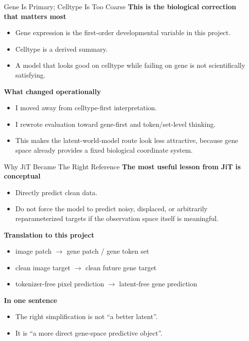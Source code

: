 \documentclass[aspectratio=169,11pt]{beamer}
\begin{document}
\begin{frame}{Gene Is Primary; Celltype Is Too Coarse}
\textbf{This is the biological correction that matters most}
\begin{itemize}
    \item Gene expression is the first-order developmental variable in this project.
    \item Celltype is a derived summary.
    \item A model that looks good on celltype while failing on gene is not scientifically satisfying.
\end{itemize}

\vspace{0.5em}
\textbf{What changed operationally}
\begin{itemize}
    \item I moved away from celltype-first interpretation.
    \item I rewrote evaluation toward gene-first and token/set-level thinking.
    \item This makes the latent-world-model route look less attractive, because gene space already provides a fixed biological coordinate system.
\end{itemize}
\end{frame}

\begin{frame}{Why JiT Became The Right Reference}
\textbf{The most useful lesson from JiT is conceptual}
\begin{itemize}
    \item Directly predict clean data.
    \item Do not force the model to predict noisy, displaced, or arbitrarily reparameterized targets if the observation space itself is meaningful.
\end{itemize}

\vspace{0.5em}
\textbf{Translation to this project}
\begin{itemize}
    \item image patch $\rightarrow$ gene patch / gene token set
    \item clean image target $\rightarrow$ clean future gene target
    \item tokenizer-free pixel prediction $\rightarrow$ latent-free gene prediction
\end{itemize}

\vspace{0.5em}
\textbf{In one sentence}
\begin{itemize}
    \item The right simplification is not ``a better latent''.
    \item It is ``a more direct gene-space predictive object''.
\end{itemize}
\end{frame}
\end{document}
